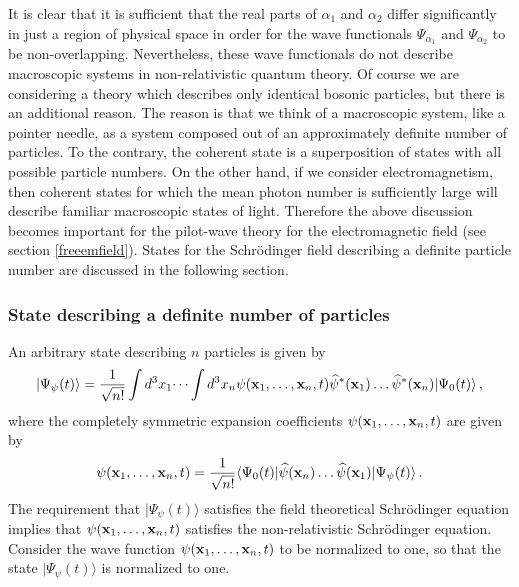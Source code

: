 \documentclass[12pt]{article}
\def\la{\langle}
\def\ra{\rangle}
\begin{document}
It is clear that it is sufficient that the real parts of $\alpha_1$ and $\alpha_2$ differ significantly in just a region of physical space in order for the wave functionals $\Psi_{\alpha_1}$ and $\Psi_{\alpha_2}$ to be non-overlapping. Nevertheless, these wave functionals do not describe macroscopic systems in non-relativistic quantum theory. Of course we are considering a theory which describes only identical bosonic particles, but there is an additional reason. The reason is that we think of a macroscopic system, like a pointer needle, as a system composed out of an approximately definite number of particles. To the contrary, the coherent state is a superposition of states with all possible particle numbers. On the other hand, if we consider electromagnetism, then coherent states for which the mean photon number is sufficiently large will describe familiar macroscopic states of light. Therefore the above discussion becomes important for the pilot-wave theory for the electromagnetic field (see section \ref{freeemfield}). States for the Schr{\"o}\-ding\-er field describing a definite particle number are discussed in the following section.



\subsubsection{State describing a definite number of particles}
An arbitrary state describing $n$ particles is given by
\begin{equation}
|\Psi_{\psi}(t) \ra =\frac{1}{\sqrt{n!}}  \int d^3 x_1 \dots \int d^3 x_n \psi({\bf x}_1,\dots,{\bf x}_n,t ) {\widehat \psi^*} ({\bf x}_1) \dots {\widehat \psi^*} ({\bf x}_n) |\Psi_0(t)\ra\,,
\label{s.29}
\end{equation}
where the completely symmetric expansion coefficients $\psi({\bf x}_1,\dots,{\bf x}_n,t )$ are given by  
\begin{equation}
\psi({\bf x}_1,\dots,{\bf x}_n,t ) = \frac{1}{\sqrt{n!}}  \la \Psi_0(t) |  {\widehat \psi} ({\bf x}_n) \dots {\widehat \psi} ({\bf x}_1) |\Psi_{\psi}(t) \ra \,.
\label{s.29.1}
\end{equation}
The requirement that $|\Psi_{\psi}(t) \ra$ satisfies the field theoretical Schr{\"o}\-ding\-er equation implies that $\psi({\bf x}_1,\dots,{\bf x}_n,t )$ satisfies the non-relativistic Schr{\"o}\-ding\-er equation. Consider the wave function $\psi({\bf x}_1,\dots,{\bf x}_n,t )$ to be normalized to one, so that the state $|\Psi_{\psi}(t) \ra$ is normalized to one.
\end{document}
